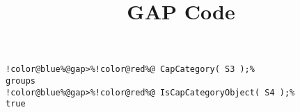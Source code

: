 \documentclass[12pt]{amsart}
\title{GAP Code}
\author{}
\begin{document}
\maketitle

\begin{Verbatim}[commandchars=!@\%,frame=single]
!color@blue%@gap>%!color@red%@ CapCategory( S3 );%
groups
!color@blue%@gap>%!color@red%@ IsCapCategoryObject( S4 );%
true
\end{Verbatim}
\end{document}
